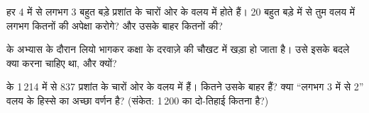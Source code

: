 \begin{exercise}[$\star\star$]\label{exo:g4:volcanoes-earthquakes-first-look:9}
हर 4 में से लगभग 3 बहुत बड़े  प्रशांत के चारों ओर के वलय में होते हैं।
20 बहुत बड़े  में से तुम वलय में लगभग कितनों की अपेक्षा करोगे? और उसके
बाहर कितनों की?
\end{exercise}

\begin{exercise}[$\star\star$]\label{exo:g4:volcanoes-earthquakes-first-look:10}
 के अभ्यास के दौरान लियो भागकर कक्षा के दरवाज़े की चौखट में खड़ा हो जाता है।
उसे इसके बदले क्या करना चाहिए था, और क्यों?
\end{exercise}

\begin{exercise}[$\star\star\star$]\label{exo:g4:volcanoes-earthquakes-first-look:11}
 के 1\,214  में से 837 प्रशांत के चारों ओर के वलय में हैं।
कितने उसके बाहर हैं? क्या ``लगभग 3 में से 2'' वलय के हिस्से का अच्छा वर्णन है?
(संकेत: 1\,200 का दो-तिहाई कितना है?)
\end{exercise}
